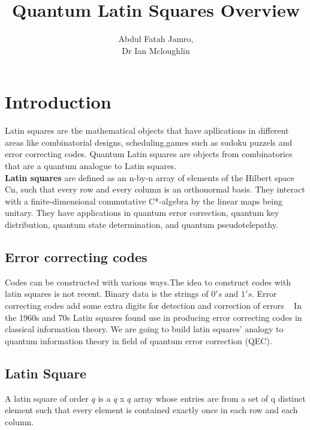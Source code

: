 \documentclass[a4paper, 12pt]{article}
\title{Quantum Latin Squares Overview}
\author{Abdul Fatah Jamro,\\  Dr Ian Mcloughlin}
\begin{document}
\maketitle

\section{Introduction}
Latin squares are the mathematical objects that have apllications in different areas 
like combinatorial designs, scheduling,games such as sudoku puzzels and error correcting codes.
Quantum Latin squares are objects from combinatorics that are a quantum analogue
to Latin squares. \\\textbf{Latin squares} are defined as an n-by-n array of elements of the 
Hilbert space Cn, such that every row and every column is an orthonormal basis. 
They interact with a finite-dimensional commutative C*-algebra by the linear maps
being unitary. They have applications in quantum error correction, quantum key 
distribution, quantum state determination, and quantum pseudotelepathy. ~\cite{Musto2019-vm}


\subsection{Error correcting codes}
Codes can be constructed with various ways.The idea to construct codes with latin squares
is not recent. Binary data is the strings of $0's$ and $1's$. Error correcting codes 
add some extra digits for detection and correction of errors ~\cite{QECC-QLS} 
In the 1960s and 70s Latin squares found use in producing error correcting codes
in classical information theory. We are going to build latin squares' analogy to
quantum information theory in field of quantum error correction (QEC).

\subsection{Latin Square}
A latin square of order $q$ is a $q$ x $q$ array whose entries are from a set of q distinct 
element such that every element is contained exactly once in each row and each column.
\end{document}

